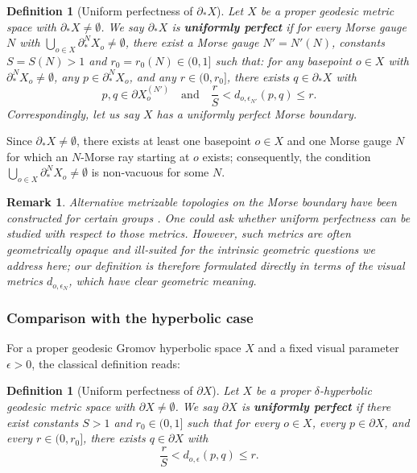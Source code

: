 \documentclass[a4paper,11pt,oneside]{article}
\newtheorem{Definition}[Theorem]{Definition}
\newtheorem{Remark}[Theorem]{Remark}
\begin{document}
\begin{Definition}[Uniform perfectness of $\partial_*X$]\label{UP}
Let $X$ be a proper geodesic metric space with $\partial_*X\neq\emptyset$. 
We say $\partial_*X$ is \textbf{uniformly perfect} if for every Morse gauge $N$ 
with $\bigcup_{o\in X}\partial_*^NX_o\neq\emptyset$, there exist a Morse gauge $N'=N'(N)$, constants $S=S(N)>1$ and $r_0=r_0(N)\in(0,1]$ such that:
for any basepoint $o\in X$ with $\partial_*^NX_o\neq\emptyset$, 
any $p\in\partial_*^NX_o$, and any $r\in(0,r_0]$, there exists $q\in\partial_*X$ with
\[
p,q\in\partial X_o^{(N')}\quad\text{and}\quad\frac{r}{S}<d_{o,\epsilon_{N'}}(p,q)\le r.
\]
Correspondingly, let us say $X$ has a uniformly perfect Morse boundary.
\end{Definition}

Since $\partial_*X\neq\emptyset$, there exists at least one basepoint $o\in X$ and one Morse gauge $N$ 
for which an $N$-Morse ray starting at $o$ exists; consequently, the condition 
$\bigcup_{o\in X}\partial_*^NX_o\neq\emptyset$ is non‑vacuous for some $N$.

\begin{Remark}
Alternative metrizable topologies on the Morse boundary have been constructed for certain groups 
\cite{Cashen19, CordesDussauleGekhtman22, qing24}. One could ask whether uniform perfectness 
can be studied with respect to those metrics. However, such metrics are often geometrically opaque 
and ill‑suited for the intrinsic geometric questions we address here; our definition is therefore 
formulated directly in terms of the visual metrics $d_{o,\epsilon_N}$, which have clear geometric meaning.
\end{Remark}

\subsubsection*{Comparison with the hyperbolic case}

For a proper geodesic Gromov hyperbolic space $X$ and a fixed visual parameter $\epsilon>0$, the classical definition reads:

\begin{Definition}[Uniform perfectness of $\partial X$]\label{def:UP-hyp}
Let $X$ be a proper $\delta$-hyperbolic geodesic metric space with $\partial X\neq\emptyset$. 
We say $\partial X$ is \textbf{uniformly perfect} if there exist constants $S>1$ and $r_0\in(0,1]$ 
such that for every $o\in X$, every $p\in\partial X$, and every $r\in(0,r_0]$, 
there exists $q\in\partial X$ with
\[
\frac{r}{S}<d_{o,\epsilon}(p,q)\le r.
\]
\end{Definition}
\end{document}
